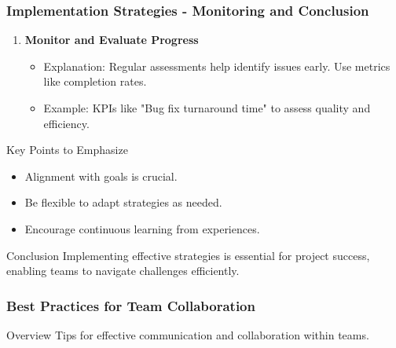 \documentclass[aspectratio=169]{beamer}
\begin{document}
\begin{frame}[fragile]
    \frametitle{Implementation Strategies - Monitoring and Conclusion}
    \begin{enumerate}[resume]
        \item \textbf{Monitor and Evaluate Progress}
            \begin{itemize}
                \item Explanation: Regular assessments help identify issues early. Use metrics like completion rates.
                \item Example: KPIs like "Bug fix turnaround time" to assess quality and efficiency.
            \end{itemize}
    \end{enumerate}

    \begin{block}{Key Points to Emphasize}
        \begin{itemize}
            \item Alignment with goals is crucial.
            \item Be flexible to adapt strategies as needed.
            \item Encourage continuous learning from experiences.
        \end{itemize}
    \end{block}
    
    \begin{block}{Conclusion}
        Implementing effective strategies is essential for project success, enabling teams to navigate challenges efficiently.
    \end{block}
\end{frame}

\begin{frame}[fragile]
    \frametitle{Best Practices for Team Collaboration}
    \begin{block}{Overview}
        Tips for effective communication and collaboration within teams.
    \end{block}
\end{frame}
\end{document}

